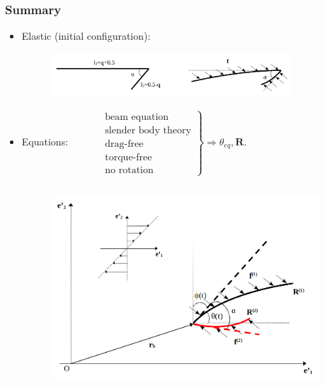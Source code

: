 \documentclass{beamer}
\begin{document}
\begin{frame}
	\frametitle{Summary}
	\begin{overlayarea}{\textwidth}{\textheight}
		\vspace{-0.3cm}	
	\begin{itemize}
		\item Elastic (initial configuration):
		\begin{figure}[htb]
			\begin{center}
				\includegraphics[width=0.85\textwidth]{plots/geometry.png}
			\end{center}
		\end{figure}\vspace{0.1cm}	
	\item Equations: \small
		$\quad \quad\quad
	\left.	\begin{aligned}
			\text{beam equation}\\
			\text{slender body theory}\\
			\text{drag-free}\\
			\text{torque-free}\\
			\text{no rotation}
		\end{aligned}\right\}\Longrightarrow \theta_{eq}, \mathbf{R}.
	$\vspace{-0.75cm}	
		\begin{columns}
	\begin{figure}[htb]
		\begin{center}
			\includegraphics[width=0.95\textwidth]{plots/fluid.png}
		\end{center}
	\end{figure}
	\end{columns}
	\end{itemize}
	\end{overlayarea}
\end{frame}
\end{document}
